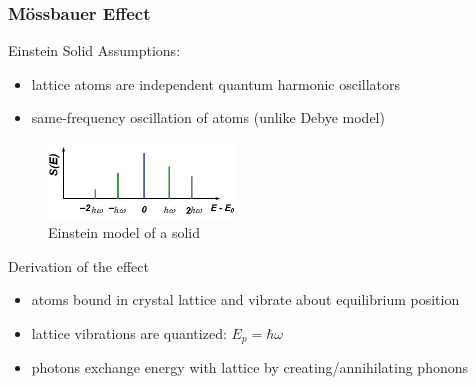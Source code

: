 	\begin{frame}
		\frametitle{Mössbauer Effect}
		\fontsize{9.5pt}{11pt}
		\begin{block}{Einstein Solid}
			Assumptions:
			\begin{itemize}
				\item lattice atoms are independent quantum harmonic oscillators
				\item same-frequency oscillation of atoms (unlike Debye model)
			\end{itemize}
		
			\begin{figure}
				\includegraphics[width=5cm]{images/einstein-model.jpg}
				\caption{Einstein model of a solid}
			\end{figure}
		\end{block}
	
		\fontsize{9.5pt}{11pt}
		\begin{block}{Derivation of the effect}
			\begin{itemize}
				\item atoms bound in crystal lattice and vibrate about equilibrium position
				\item lattice vibrations are quantized: $E_p=\hbar \omega$
				\item photons exchange energy with lattice by creating/annihilating phonons
			\end{itemize}
		\end{block}
	
	\end{frame}
	
